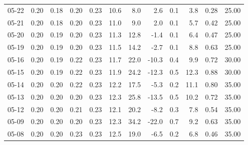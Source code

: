 \begin{threeparttable}
{\begin{tabular}{lrrrrrrrrrrr}
  05-22 &          0.20 &          0.18 &          0.20 &        0.23 &                10.6 &                 8.0 &        2.6 &                 0.1 &              3.8 &            0.28 &                  25.00 \\
  05-21 &          0.20 &          0.18 &          0.20 &        0.23 &                11.0 &                 9.0 &        2.0 &                 0.1 &              5.7 &            0.42 &                  25.00 \\
  05-20 &          0.20 &          0.19 &          0.20 &        0.23 &                11.3 &                12.8 &       -1.4 &                 0.1 &              6.4 &            0.47 &                  25.00 \\
  05-19 &          0.20 &          0.19 &          0.20 &        0.23 &                11.5 &                14.2 &       -2.7 &                 0.1 &              8.8 &            0.63 &                  25.00 \\
  05-16 &          0.20 &          0.19 &          0.22 &        0.23 &                11.7 &                22.0 &      -10.3 &                 0.4 &              9.9 &            0.72 &                  30.00 \\
  05-15 &          0.20 &          0.19 &          0.22 &        0.23 &                11.9 &                24.2 &      -12.3 &                 0.5 &             12.3 &            0.88 &                  30.00 \\
  05-14 &          0.20 &          0.20 &          0.22 &        0.23 &                12.2 &                17.5 &       -5.3 &                 0.2 &             11.1 &            0.80 &                  35.00 \\
  05-13 &          0.20 &          0.20 &          0.20 &        0.23 &                12.3 &                25.8 &      -13.5 &                 0.5 &             10.2 &            0.72 &                  35.00 \\
  05-12 &          0.20 &          0.20 &          0.21 &        0.23 &                12.1 &                20.2 &       -8.2 &                 0.3 &              7.8 &            0.54 &                  35.00 \\
  05-09 &          0.20 &          0.20 &          0.20 &        0.23 &                12.3 &                34.2 &      -22.0 &                 0.7 &              9.2 &            0.63 &                  35.00 \\
  05-08 &          0.20 &          0.20 &          0.23 &        0.23 &                12.5 &                19.0 &       -6.5 &                 0.2 &              6.8 &            0.46 &                  35.00 \\

\end{tabular}}
\end{threeparttable}
